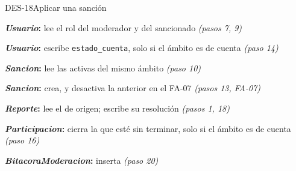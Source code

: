 \begin{fichacu}{DES-18}{Aplicar una sanción}
{\begin{cudatos}
      \item \textbf{\textit{Usuario}:} lee el rol del moderador y del sancionado \textit{(pasos 7, 9)}
      \item \textbf{\textit{Usuario}:} escribe \texttt{estado\_\allowbreak{}cuenta}, solo si el ámbito es de cuenta \textit{(paso 14)}
      \item \textbf{\textit{Sancion}:} lee las activas del mismo ámbito \textit{(paso 10)}
      \item \textbf{\textit{Sancion}:} crea, y desactiva la anterior en el \mbox{FA-07} \textit{(pasos 13, \mbox{FA-07})}
      \item \textbf{\textit{Reporte}:} lee el de origen; escribe su resolución \textit{(pasos 1, 18)}
      \item \textbf{\textit{Participacion}:} cierra la que esté sin terminar, solo si el ámbito es de cuenta \textit{(paso 16)}
      \item \textbf{\textit{BitacoraModeracion}:} inserta \textit{(paso 20)}
    \end{cudatos}} \\ \hline
\end{fichacu}
\clearpage

